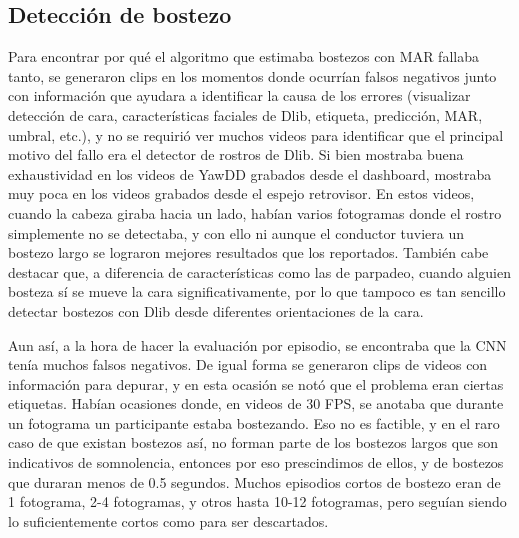 \subsection{Detección de bostezo}

Para encontrar por qué el algoritmo que estimaba bostezos con MAR fallaba tanto, se generaron clips en los momentos donde ocurrían falsos negativos junto con información que ayudara a identificar la causa de los errores (visualizar detección de cara, características faciales de Dlib, etiqueta, predicción, MAR, umbral, etc.), y no se requirió ver muchos videos para identificar que el principal motivo del fallo era el detector de rostros de Dlib. Si bien mostraba buena exhaustividad en los videos de YawDD grabados desde el dashboard, mostraba muy poca en los videos grabados desde el espejo retrovisor. En estos videos, cuando la cabeza giraba hacia un lado, habían varios fotogramas donde el rostro simplemente no se detectaba, y con ello ni aunque el conductor tuviera un bostezo largo se lograron mejores resultados que los reportados. También cabe destacar que, a diferencia de características como las de parpadeo, cuando alguien bosteza sí se mueve la cara significativamente, por lo que tampoco es tan sencillo detectar bostezos con Dlib desde diferentes orientaciones de la cara. 

Aun así, a la hora de hacer la evaluación por episodio, se encontraba que la CNN tenía muchos falsos negativos. De igual forma se generaron clips de videos con información para depurar, y en esta ocasión se notó que el problema eran ciertas etiquetas. Habían ocasiones donde, en videos de 30 FPS, se anotaba que durante un fotograma un participante estaba bostezando. Eso no es factible, y en el raro caso de que existan bostezos así, no forman parte de los bostezos largos que son indicativos de somnolencia, entonces por eso prescindimos de ellos, y de bostezos que duraran menos de 0.5 segundos. Muchos episodios cortos de bostezo eran de 1 fotograma, 2-4 fotogramas, y otros hasta 10-12 fotogramas, pero seguían siendo lo suficientemente cortos como para ser descartados. 


